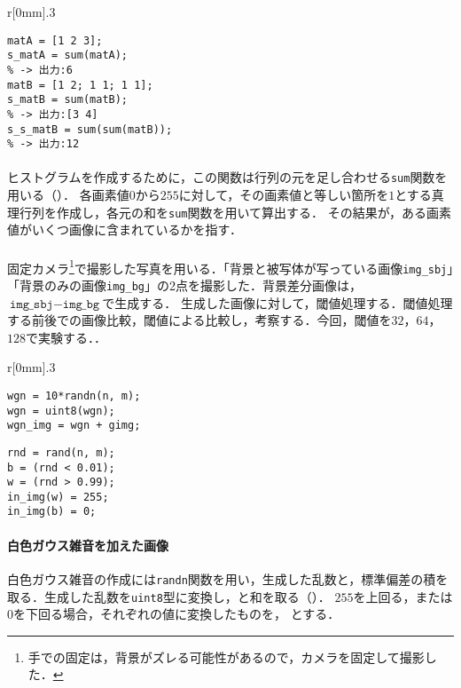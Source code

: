\begin{wrapfigure}{r}[0mm]{.3\textwidth}
    \centering
    \vspace{-.9cm}
    \begin{lstlisting}[caption={\texttt{sum}関数},label={src:sum関数}]
matA = [1 2 3];
s_matA = sum(matA); 
% -> 出力:6
matB = [1 2; 1 1; 1 1];
s_matB = sum(matB); 
% -> 出力:[3 4]
s_s_matB = sum(sum(matB)); 
% -> 出力:12
    \end{lstlisting}
    \vspace{-.7cm}
\end{wrapfigure}
\paragraph{\kadaiae}
ヒストグラムを作成するために，この関数は行列の元を足し合わせる\texttt{sum}関数を用いる（）．
各画素値\(0\)から\(255\)に対して，その画素値と等しい箇所を\(1\)とする真理行列を作成し，各元の和を\texttt{sum}関数を用いて算出する．
その結果が，ある画素値がいくつ画像に含まれているかを指す．
\paragraph{\kadaiaf}
固定カメラ\footnote{手での固定は，背景がズレる可能性があるので，カメラを固定して撮影した．}で撮影した写真を用いる．「背景と被写体が写っている画像\texttt{img\_sbj}」「背景のみの画像\texttt{img\_bg}」の2点を撮影した．背景差分画像は，\(\texttt{img\_sbj}-\texttt{img\_bg}\)で生成する．
生成した画像に対して，閾値処理する．閾値処理する前後での画像比較，閾値による比較し，考察する．今回，閾値を\(32\)，\(64\)，\(128\)で実験する．\scall{\kadaiaf}．

\begin{wrapfigure}{r}[0mm]{.3\textwidth}
    \vspace{-.5cm}
    \begin{lstlisting}[caption={白色ガウス雑音画像の生成},label={src:白色ガウス雑音画像の生成}]
% 画像サイズ : n x m
wgn = 10*randn(n, m);
wgn = uint8(wgn);
wgn_img = wgn + gimg;
    \end{lstlisting}
    \begin{lstlisting}[caption={インパルス雑音画像の生成},label={src:インパルス雑音画像の生成}]
% 画像サイズ : n x m
rnd = rand(n, m);
b = (rnd < 0.01);
w = (rnd > 0.99);
in_img(w) = 255;
in_img(b) = 0;
    \end{lstlisting}
    \vspace{-1cm}
\end{wrapfigure}
\paragraph{白色ガウス雑音を加えた画像}白色ガウス雑音の作成には\texttt{randn}関数を用い，生成した乱数と，標準偏差の積を取る．生成した乱数を\texttt{uint8}型に変換し，\originimg と和を取る（）．
\(255\)を上回る，または\(0\)を下回る場合，それぞれの値に変換したものを， \wgnimg とする．
